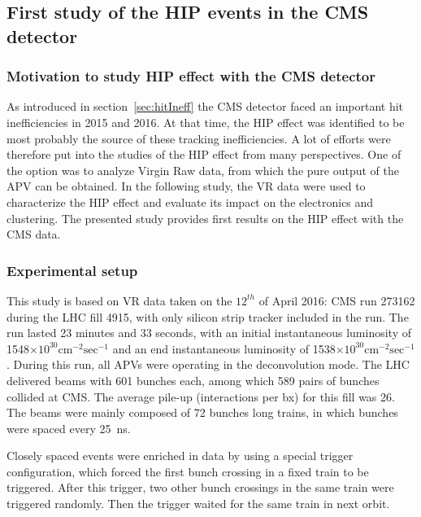 \subsection{First study of the HIP events in the CMS detector~\label{sec:firstStudy}}

\subsubsection{Motivation to study HIP effect with the CMS detector}

As introduced in section~\ref{sec:hitIneff} the CMS detector faced an important hit inefficiencies in 2015 and 2016. At that time, the HIP effect was identified to be most probably the source of these tracking inefficiencies. A lot of efforts were therefore put into the studies of the HIP effect from many perspectives. One of the option was to analyze Virgin Raw data, from which the pure output of the APV can be obtained. In the following study, the VR data were used to characterize the HIP effect and evaluate its impact on the electronics and clustering. The presented study provides first results on the HIP effect with the CMS data.

\subsubsection{Experimental setup} 

This study is based on VR data taken on the $12^{th}$ of April 2016: CMS run 273162 during the LHC fill 4915, with only silicon strip tracker included in the run. The run lasted 23 minutes and 33 seconds, with an initial instantaneous luminosity of 1548$\times 10^{30} \mathrm{cm^{-2} sec^{-1}}$ and an end instantaneous luminosity of 1538$\times 10^{30} \mathrm{cm^{-2} sec^{-1}}$. During this run, all APVs were operating in the deconvolution mode. The LHC delivered beams with 601 bunches each, among which 589 pairs of bunches collided at CMS. The average pile-up (interactions per bx) for this fill was 26. The beams were mainly composed of 72 bunches long trains, in which bunches were spaced every 25~ns.

Closely spaced events were enriched in data by using a special trigger configuration, which forced the first bunch crossing in a fixed train to be triggered. After this trigger, two other bunch crossings in the same train were triggered randomly. Then the trigger waited for the same train in next orbit. 


